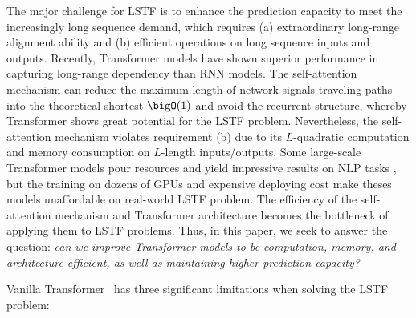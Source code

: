 The major challenge for LSTF is to enhance the prediction capacity to meet the increasingly long sequence demand, which requires (a) extraordinary long-range alignment ability and (b) efficient operations on long sequence inputs and outputs.
Recently, Transformer models have shown superior performance in capturing long-range dependency than RNN models. The self-attention mechanism can reduce the maximum length of network signals traveling paths into the theoretical shortest $\bigO(1)$ and avoid the recurrent structure, whereby Transformer shows great potential for the LSTF problem.
Nevertheless, the self-attention mechanism violates requirement (b) due to its $L$-quadratic computation and memory consumption on $L$-length inputs/outputs. Some large-scale Transformer models pour resources and yield impressive results on NLP tasks \cite{DBLP:journals/corr/abs-2005-14165}, but the training on dozens of GPUs and expensive deploying cost make theses models unaffordable on real-world LSTF problem. The efficiency of the self-attention mechanism and Transformer architecture becomes the bottleneck of applying them to LSTF problems.
Thus, in this paper, we seek to answer the question: \emph{can we improve Transformer models to be computation, memory, and architecture efficient, as well as maintaining higher prediction capacity?}

Vanilla Transformer~\cite{vaswani2017attention} has three significant limitations when solving the LSTF problem:

